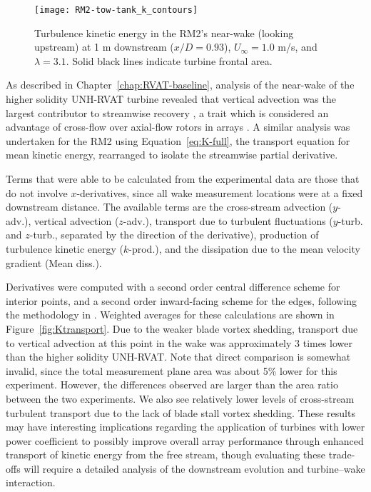 \begin{figure}
    \centering

    \texttt{[image: RM2-tow-tank\_k\_contours]}
    
    \caption{Turbulence kinetic energy in the RM2's near-wake (looking upstream)
        at 1 m downstream ($x/D=0.93$), $U_\infty=1.0$ m/s, and $\lambda=3.1$. Solid
        black lines indicate turbine frontal area.}
    
    \label{fig:kcont}
\end{figure}

As described in Chapter~\ref{chap:RVAT-baseline}, analysis of the near-wake of
the higher solidity UNH-RVAT turbine revealed that vertical advection was the
largest contributor to streamwise recovery \cite{Bachant2015-JoT}, a trait which
is considered an advantage of cross-flow over axial-flow rotors in arrays
\cite{Kinzel2012}. A similar analysis was undertaken for the RM2 using
Equation~\ref{eq:K-full}, the transport equation for mean kinetic energy,
rearranged to isolate the streamwise partial derivative.

Terms that were able to be calculated from the experimental data are those that
do not involve $x$-derivatives, since all wake measurement locations were at a
fixed downstream distance. The available terms are the cross-stream advection
($y$-adv.), vertical advection ($z$-adv.), transport due to turbulent
fluctuations ($y$-turb. and $z$-turb., separated by the direction of the
derivative), production of turbulence kinetic energy ($k$-prod.), and the
dissipation due to the mean velocity gradient (Mean diss.).

Derivatives were computed with a second order central difference scheme for
interior points, and a second order inward-facing scheme for the edges,
following the methodology in \cite{Bachant2015-JoT}. Weighted averages for these
calculations are shown in Figure~\ref{fig:Ktransport}. Due to the weaker blade
vortex shedding, transport due to vertical advection at this point in the wake
was approximately 3 times lower than the higher solidity UNH-RVAT. Note that
direct comparison is somewhat invalid, since the total measurement plane area
was about 5\% lower for this experiment. However, the differences observed are
larger than the area ratio between the two experiments. We also see relatively
lower levels of cross-stream turbulent transport due to the lack of blade stall
vortex shedding. These results may have interesting implications regarding the
application of turbines with lower power coefficient to possibly improve overall
array performance through enhanced transport of kinetic energy from the free
stream, though evaluating these trade-offs will require a detailed analysis of
the downstream evolution and turbine--wake interaction.

